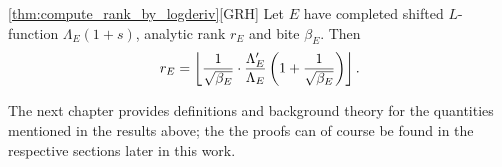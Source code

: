 \begin{quotedtheorem}{\ref{thm:compute_rank_by_logderiv}}[GRH]
Let $E$ have completed shifted $L$-function $\Lambda_E(1+s)$, analytic rank $r_E$ and bite $\beta_E$. Then
\begin{equation}
r_E = \left\lfloor\frac{1}{\sqrt{\beta_E}}\cdot \frac{\Lambda_E^{\prime}}{\Lambda_E}\left(1+\frac{1}{\sqrt{\beta_E}}\right)\right\rfloor.
\end{equation}
\end{quotedtheorem}

The next chapter provides definitions and background theory for the quantities mentioned in the results above; the the proofs can of course be found in the respective sections later in this work.


